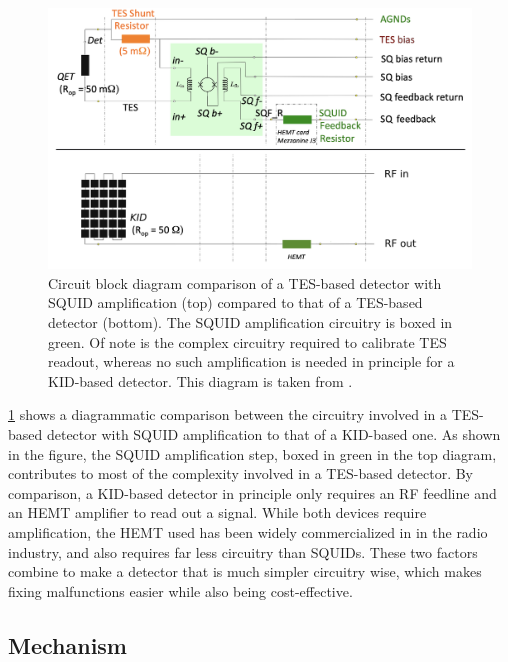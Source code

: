 \begin{figure}
	\centering
	\includegraphics[scale=0.5]{images/kid-circuit.png}
	\caption{Circuit block diagram comparison of a TES-based detector with SQUID amplification (top) compared to
		that of a TES-based detector (bottom). The SQUID amplification circuitry is boxed in green. 
		Of note is the complex circuitry required to calibrate TES readout, whereas no such amplification is needed 
		in principle for a KID-based detector. This diagram is taken from \cite{changSuperCDMSHVeVRun}.}
	\label{kid-block}
\end{figure}

\cref{kid-block} shows a diagrammatic comparison between the circuitry involved in a TES-based detector
with SQUID amplification to that of a KID-based one. As shown in the figure, the SQUID amplification step,
boxed in green in the top diagram, contributes to most of the complexity involved in a TES-based detector. By
comparison, a KID-based detector in principle only requires an RF feedline and an HEMT amplifier to read out
a signal. While both devices require amplification, the HEMT used has been widely commercialized in in the
radio industry, and also requires far less circuitry than SQUIDs. These two factors combine to make a
detector that is much simpler circuitry wise, which makes fixing malfunctions easier while also being
cost-effective.


\subsection{Mechanism}

